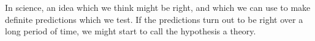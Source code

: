 In science, an idea which we think might be right, and
which we can use to make definite predictions which we
test. If the predictions turn out to be right over a
long period of time, we might start to call the hypothesis
a theory.